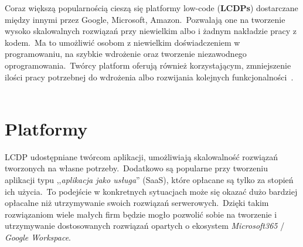 Coraz większą popularnością cieszą się platformy low-code  (\textbf{LCDPs}) dostarczane między innymi przez Google, Microsoft, Amazon.\ Pozwalają one na tworzenie wysoko skalowalnych rozwiązań przy niewielkim albo i żadnym nakładzie pracy z kodem.\ Ma to umożliwić osobom z niewielkim doświadczeniem w programowaniu, na szybkie wdrożenie oraz tworzenie niezawodnego oprogramowania.\ Twórcy platform oferują również korzystającym, zmniejszenie ilości pracy potrzebnej do wdrożenia albo rozwijania kolejnych funkcjonalności~\cite{Bock2021, Hirzel2022}.
\\ \\
\section{Platformy}
LCDP udostępniane twórcom aplikacji, umożliwiają skalowalność rozwiązań tworzonych na własne potrzeby.\ Dodatkowo są popularne przy tworzeniu aplikacji typu ,,\textit{aplikacja jako usługa}''  (SaaS), które opłacane są tylko za stopień ich użycia.\ To podejście w konkretnych sytuacjach może się okazać dużo bardziej opłacalne niż utrzymywanie swoich rozwiązań serwerowych.\ Dzięki takim rozwiązaniom wiele małych firm będzie mogło pozwolić sobie na tworzenie i utrzymywanie dostosowanych rozwiązań opartych o ekosystem \textit{Microsoft365} / \textit{Google Workspace}.

\vfill
\pagebreak

